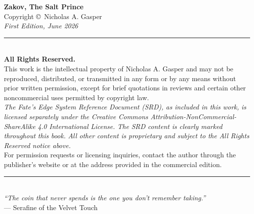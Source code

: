 \cleardoublepage
\thispagestyle{empty}
\begin{center}
  \vspace*{2in}
  {\LARGE\textbf{Zakov, The Salt Prince}}\\[0.3in]
  Copyright \copyright\ Nicholas A. Gasper\\[0.2in]
  \textit{First Edition, June 2026}\\[0.2in]

  \rule{0.6\textwidth}{0.4pt}\\[0.3in]

  \textbf{All Rights Reserved.}\\[0.1in]
  This work is the intellectual property of Nicholas A. Gasper and may not be reproduced,
  distributed, or transmitted in any form or by any means without prior written permission,
  except for brief quotations in reviews and certain other noncommercial uses permitted
  by copyright law.\\[0.2in]

  \textit{The Fate's Edge System Reference Document (SRD), as included in this work,}
  \textit{is licensed separately under the Creative Commons Attribution-NonCommercial-ShareAlike}
  \textit{4.0 International License. The SRD content is clearly marked throughout this book.}
  \textit{All other content is proprietary and subject to the All Rights Reserved notice above.}\\[0.2in]

  For permission requests or licensing inquiries, contact the author through the
  publisher's website or at the address provided in the commercial edition.\\[0.3in]

  \rule{0.5\textwidth}{0.4pt}\\[0.2in]
  \textit{``The coin that never spends is the one you don't remember taking.''}\\[0.1in]
  --- Serafine of the Velvet Touch
\end{center}
\newpage
\cleardoublepage
\thispagestyle{empty}

